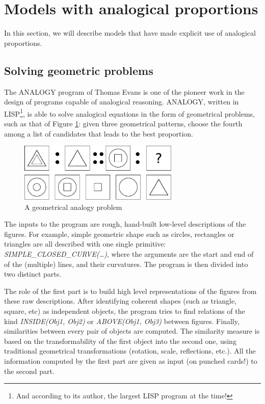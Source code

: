 \section{Models with analogical proportions}
\label{SEC:models_with_analogical_proportions}

In this section, we will describe models that have made explicit use of
analogical proportions.

\subsection{Solving geometric problems}

The ANALOGY program of Thomas Evans \cite{Eva64} is one of the pioneer work in
the design of programs capable of analogical reasoning. ANALOGY, written in
LISP\footnote{And according to its author, the largest LISP program at the
time!}, is able to solve analogical equations in the form of geometrical
problems, such as that of Figure \ref{FIG:evans}: given three geometrical
patterns, choose the fourth among a list of candidates that leads to the best
proportion.

\begin{figure}[!h]
\centering
\includegraphics[width=3in]{figures/evans.pdf}
\caption{A geometrical analogy problem}
\label{FIG:evans}
\end{figure}

The inputs to the program are rough, hand-built low-level descriptions of the
figures. For example, simple geometric shape such as circles, rectangles or
triangles are all described with one single primitive:
\textit{SIMPLE\_CLOSED\_CURVE(\dots)}, where the arguments are the start and
end of of the (multiple) lines, and their curvatures. The program is then
divided into two distinct parts.

The role of the first part is to build high level representations of the
figures from these raw descriptions. After identifying coherent shapes (such as
triangle, square, etc) as independent objects, the program tries to find
relations of the kind \textit{INSIDE(Obj1, Obj2)} or \textit{ABOVE(Obj1, Obj3)}
between figures. Finally, similarities between every pair of objects are
computed. The similarity measure is based on the transformability of the first
object into the second one, using traditional geometrical transformations
(rotation, scale, reflections, etc.). All the information computed by the first
part are given as input (on punched cards!) to the second part.

